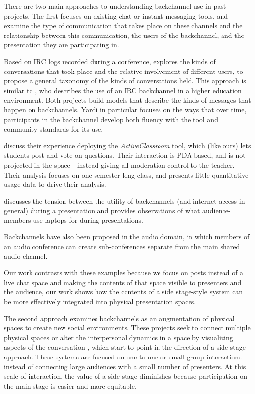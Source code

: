 There are two main approaches to understanding backchannel use in past projects. The first focuses on existing chat or instant messaging tools, and examine the type of communication that takes place on these channels and the relationship between this communication, the users of the backchannel, and the presentation they are participating in.

Based on IRC logs recorded during a conference, \citet{mccarthy_digital_2004} explores the kinds of conversations that took place and the relative involvement of different users, to propose a general taxonomy of the kinds of conversations held. This approach is similar to \citet{Yardi:2006uk}, who describes the use of an IRC backchannel in a higher education environment. Both projects build models that describe the kinds of messages that happen on backchannels. Yardi in particular focuses on the ways that over time, participants in the backchannel develop both fluency with the tool and community standards for its use.

\citet{Ratto:2003vs} discuss their experience deploying the \emph{ActiveClassroom} tool, which (like ours) lets students post and vote on questions. Their interaction is PDA based, and is not projected in the space---instead giving all moderation control to the teacher. Their analysis focuses on one semester long class, and presents little quantitative usage data to drive their analysis.

\citet{Golub:2005ws} discusses the tension between the utility of backchannels (and internet access in general) during a presentation and provides observations of what audience-members use laptops for during presentations.

Backchannels have also been proposed in the audio domain, in which members of an audio conference can create sub-conferences separate from the main shared audio channel. \citep{Yankelovich:2005bx}

Our work contrasts with these examples because we focus on posts instead of a live chat space and making the contents of that space visible to presenters and the audience, our work shows how the contents of a side stage-style system can be more effectively integrated into physical presentation spaces. 

The second approach examines backchannels as an augmentation of physical spaces to create new social environments. These projects seek to connect multiple physical spaces \citep{Karahalios:2004eg} or alter the interpersonal dynamics in a space by visualizing aspects of the conversation \citep{DiMicco:2007ie,Donath:1999kw,Bergstrom:2007je}, which start to point in the direction of a side stage approach. These systems are focused on one-to-one or small group interactions instead of connecting large audiences with a small number of presenters. At this scale of interaction, the value of a side stage diminishes because participation on the main stage is easier and more equitable. 

